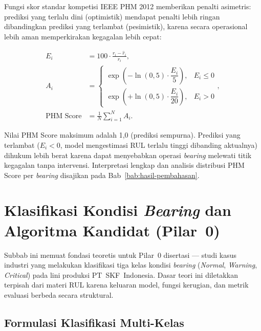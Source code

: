 Fungsi skor standar kompetisi IEEE PHM 2012 
memberikan penalti asimetris: prediksi yang terlalu dini (optimistik)
mendapat penalti lebih ringan dibandingkan prediksi yang terlambat
(pesimistik), karena secara operasional lebih aman memperkirakan kegagalan
lebih cepat:

\begin{align}
  E_i &= 100 \cdot \frac{r_i - \hat{r}_i}{r_i}, \label{eq:bab3_phm_ei} \\
  A_i &= \begin{cases}
    \exp\!\left(-\ln(0{,}5) \cdot \dfrac{E_i}{5}\right), & E_i \leq 0 \\[6pt]
    \exp\!\left(+\ln(0{,}5) \cdot \dfrac{E_i}{20}\right), & E_i > 0
  \end{cases}, \label{eq:bab3_phm_ai} \\
  \text{PHM Score} &= \frac{1}{N} \sum_{i=1}^{N} A_i. \label{eq:bab3_phm_score}
\end{align}

Nilai PHM Score maksimum adalah 1,0 (prediksi sempurna). Prediksi yang
terlambat ($E_i < 0$, model mengestimasi RUL terlalu tinggi dibanding
aktualnya) dihukum lebih berat karena dapat menyebabkan operasi \emph{bearing}
melewati titik kegagalan tanpa intervensi. Interpretasi lengkap dan analisis
distribusi PHM Score per \emph{bearing} disajikan pada
Bab~\ref{bab:hasil-pembahasan}.

\section{Klasifikasi Kondisi \emph{Bearing} dan Algoritma Kandidat (Pilar~0)}
\label{sec:bab3_klasifikasi}

Subbab ini memuat fondasi teoretis untuk Pilar~0 disertasi --- studi
kasus industri yang melakukan klasifikasi tiga kelas kondisi \emph{bearing}
(\emph{Normal}, \emph{Warning}, \emph{Critical}) pada lini produksi
PT~SKF~Indonesia. Dasar teori ini diletakkan terpisah dari materi RUL
karena keluaran model, fungsi kerugian, dan metrik evaluasi berbeda
secara struktural.

\subsection{Formulasi Klasifikasi Multi-Kelas}
\label{subsec:bab3_kls_formulasi}

